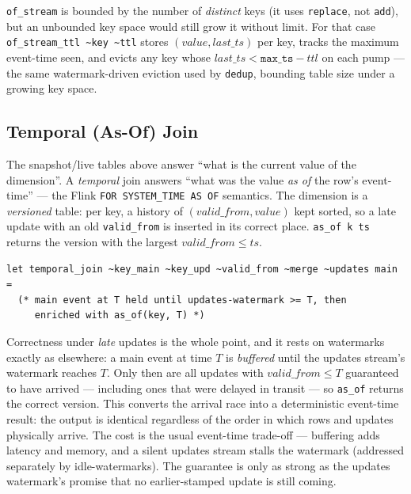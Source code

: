 \documentclass[11pt,a4paper]{article}
\begin{document}
\texttt{of\_stream} is bounded by the number of {\it distinct} keys
(it uses \texttt{replace}, not \texttt{add}), but an unbounded key
space would still grow it without limit. For that case
\texttt{of\_stream\_ttl \textasciitilde{}key \textasciitilde{}ttl}
stores $(value, last\_ts)$ per key, tracks the maximum event-time
seen, and evicts any key whose $last\_ts < \mathtt{max\_ts} - ttl$ on
each pump — the same watermark-driven eviction used by \texttt{dedup},
bounding table size under a growing key space.

\subsection{Temporal (As-Of) Join}

The snapshot/live tables above answer ``what is the current value of the
dimension''. A \emph{temporal} join answers ``what was the value
\emph{as of} the row's event-time'' --- the Flink
\texttt{FOR SYSTEM\_TIME AS OF} semantics. The dimension is a
\emph{versioned} table: per key, a history of $(valid\_from, value)$ kept
sorted, so a late update with an old \texttt{valid\_from} is inserted in
its correct place. \texttt{as\_of k ts} returns the version with the
largest $valid\_from \leq ts$.

\begin{lstlisting}
let temporal_join ~key_main ~key_upd ~valid_from ~merge ~updates main =
  (* main event at T held until updates-watermark >= T, then
     enriched with as_of(key, T) *)
\end{lstlisting}

Correctness under \emph{late} updates is the whole point, and it rests on
watermarks exactly as elsewhere: a main event at time $T$ is
\emph{buffered} until the updates stream's watermark reaches $T$. Only
then are all updates with $valid\_from \leq T$ guaranteed to have arrived
--- including ones that were delayed in transit --- so \texttt{as\_of}
returns the correct version. This converts the arrival race into a
deterministic event-time result: the output is identical regardless of
the order in which rows and updates physically arrive. The cost is the
usual event-time trade-off --- buffering adds latency and memory, and a
silent updates stream stalls the watermark (addressed separately by
idle-watermarks). The guarantee is only as strong as the updates
watermark's promise that no earlier-stamped update is still coming.

\end{document}
